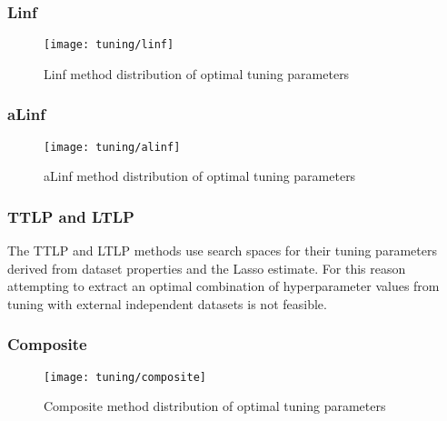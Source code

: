 \subsubsection{Linf}
\begin{figure}[H]
	\centering
	\texttt{[image: tuning/linf]}
	\caption{Linf method distribution of optimal tuning parameters}
	\label{fig:tun_linf}
\end{figure}

\subsubsection{aLinf}
\begin{figure}[H]
	\centering
	\texttt{[image: tuning/alinf]}
	\caption{aLinf method distribution of optimal tuning parameters}
	\label{fig:tun_alinf}
\end{figure}

\subsubsection{TTLP and LTLP}
The TTLP and LTLP methods use search spaces for their tuning parameters derived from dataset properties and the Lasso estimate. For this reason attempting to extract an optimal combination of hyperparameter values from tuning with external independent datasets is not feasible. 

\subsubsection{Composite}
\begin{figure}[H]
	\centering
	\texttt{[image: tuning/composite]}
	\caption{Composite method distribution of optimal tuning parameters}
	\label{fig:tun_composite}
\end{figure}
